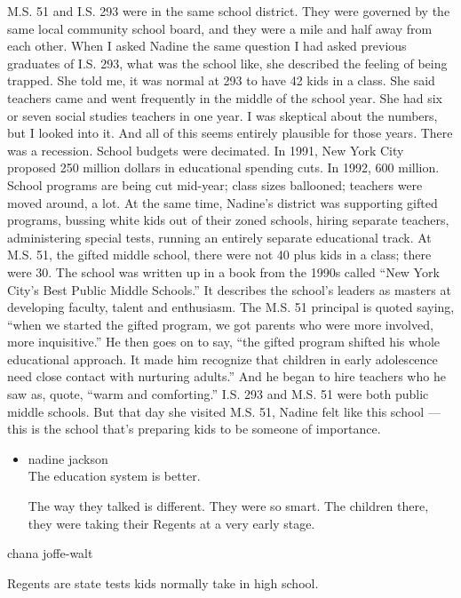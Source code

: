 M.S. 51 and I.S. 293 were in the same school district. They were
governed by the same local community school board, and they were a mile
and half away from each other. When I asked Nadine the same question I
had asked previous graduates of I.S. 293, what was the school like, she
described the feeling of being trapped. She told me, it was normal at
293 to have 42 kids in a class. She said teachers came and went
frequently in the middle of the school year. She had six or seven social
studies teachers in one year. I was skeptical about the numbers, but I
looked into it. And all of this seems entirely plausible for those
years. There was a recession. School budgets were decimated. In 1991,
New York City proposed 250 million dollars in educational spending cuts.
In 1992, 600 million. School programs are being cut mid-year; class
sizes ballooned; teachers were moved around, a lot. At the same time,
Nadine's district was supporting gifted programs, bussing white kids out
of their zoned schools, hiring separate teachers, administering special
tests, running an entirely separate educational track. At M.S. 51, the
gifted middle school, there were not 40 plus kids in a class; there were
30. The school was written up in a book from the 1990s called ``New York
City's Best Public Middle Schools.'' It describes the school's leaders
as masters at developing faculty, talent and enthusiasm. The M.S. 51
principal is quoted saying, ``when we started the gifted program, we got
parents who were more involved, more inquisitive.'' He then goes on to
say, ``the gifted program shifted his whole educational approach. It
made him recognize that children in early adolescence need close contact
with nurturing adults.'' And he began to hire teachers who he saw as,
quote, ``warm and comforting.'' I.S. 293 and M.S. 51 were both public
middle schools. But that day she visited M.S. 51, Nadine felt like this
school --- this is the school that's preparing kids to be someone of
importance.

\begin{itemize}
\item
  nadine jackson\\
  The education system is better.

  The way they talked is different. They were so smart. The children
  there, they were taking their Regents at a very early stage.
\end{itemize}

chana joffe-walt

Regents are state tests kids normally take in high school.

